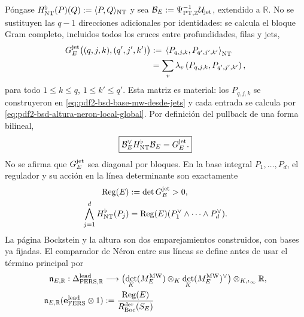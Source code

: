 \begin{proposition}
Póngase
$H_{\rm NT}^{\flat}(P)(Q):=\langle P,Q\rangle_{\rm NT}$ y sea
$\mathcal B_E:=\Psi_{{\rm PT},\mathbb Z}^{-1}\mathcal U_{\rm jet}$,
extendido a $\mathbb R$. No se sustituyen las $q-1$ direcciones adicionales
por identidades: se calcula el bloque Gram completo, incluidos todos los
cruces entre profundidades, filas y jets,
\begin{equation}\label{eq:pdf2-bsd-gram-jet-completo}
 \begin{aligned}
 G_E^{\rm jet}\bigl((q,j,k),(q',j',k')\bigr)
 &:={}
 \left\langle P_{q,j,k},P_{q',j',k'}\right\rangle_{\rm NT}\\
 &=\sum_v\lambda_v
   \left(P_{q,j,k},P_{q',j',k'}\right),
 \end{aligned}
\end{equation}
para todo $1\le k\le q$, $1\le k'\le q'$. Esta matriz es material: los
$P_{q,j,k}$ se construyeron en
\eqref{eq:pdf2-bsd-base-mw-desde-jets} y cada entrada se calcula por
\eqref{eq:pdf2-bsd-altura-neron-local-global}. Por definición del pullback
de una forma bilineal,
\begin{equation}\label{eq:pdf2-bsd-altura-nt-generadores}
 \boxed{
 \mathcal B_E^\vee H_{\rm NT}^{\flat}\mathcal B_E=G_E^{\rm jet}.}
\end{equation}
No se afirma que $G_E^{\rm jet}$ sea diagonal por bloques. En la base
integral $P_1,\ldots,P_d$, el regulador y su acción en la línea determinante
son exactamente
\begin{equation}\label{eq:pdf2-bsd-regulador-cuna-altura}
 \begin{aligned}
 \operatorname{Reg}(E)&:=\det G_E^{\rm jet}>0,\\
 \bigwedge_{j=1}^dH_{\rm NT}^{\flat}(P_j)
 &=\operatorname{Reg}(E)
   (P_1^\vee\wedge\cdots\wedge P_d^\vee).
 \end{aligned}
\end{equation}
La página Bockstein y la altura son dos emparejamientos construidos, con
bases ya fijadas. El comparador de Néron entre sus líneas se define antes de
usar el término principal por
\begin{equation}\label{eq:pdf2-bsd-comparador-neron-jet}
 \begin{aligned}
 \mathfrak n_{E,\mathbb R}:
 \Delta_{{\rm FERS},\mathbb R}^{\rm lead}&\longrightarrow
 \bigl(\det_K(M_E^{\rm MW})\otimes_K
 \det_K(M_E^{\rm MW})^\vee\bigr)\otimes_{K,\iota_\infty}\mathbb R,\\
 \mathfrak n_{E,\mathbb R}
 (\mathbf e_{\rm FERS}^{\rm lead}\otimes1)
 &:=\frac{\operatorname{Reg}(E)}{R_{\rm Boc}^{\rm der}(S_E)}

\end{aligned}
\end{equation}
\end{proposition}

